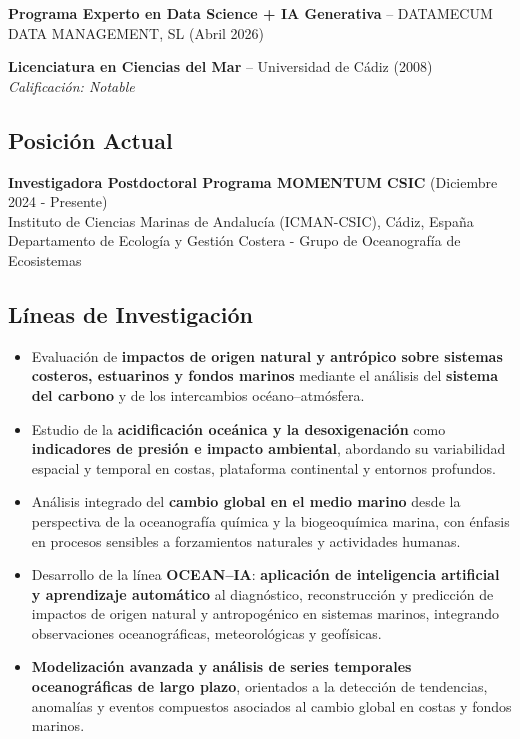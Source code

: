 \documentclass[11pt,a4paper]{article}
\begin{document}
\textbf{Programa Experto en Data Science + IA Generativa} -- DATAMECUM DATA MANAGEMENT, SL (Abril 2026)

\textbf{Licenciatura en Ciencias del Mar} -- Universidad de Cádiz (2008)\\
\textit{Calificación: Notable}

\subsection*{Posición Actual}

\textbf{Investigadora Postdoctoral Programa MOMENTUM CSIC} (Diciembre 2024 - Presente)\\
Instituto de Ciencias Marinas de Andalucía (ICMAN-CSIC), Cádiz, España\\
Departamento de Ecología y Gestión Costera - Grupo de Oceanografía de Ecosistemas

\subsection*{Líneas de Investigación}

\begin{itemize}[leftmargin=*]
    \item Evaluación de \textbf{impactos de origen natural y antrópico sobre sistemas costeros, estuarinos y fondos marinos} mediante el análisis del \textbf{sistema del carbono} y de los intercambios océano–atmósfera.
    \item Estudio de la \textbf{acidificación oceánica y la desoxigenación} como \textbf{indicadores de presión e impacto ambiental}, abordando su variabilidad espacial y temporal en costas, plataforma continental y entornos profundos.
    \item Análisis integrado del \textbf{cambio global en el medio marino} desde la perspectiva de la oceanografía química y la biogeoquímica marina, con énfasis en procesos sensibles a forzamientos naturales y actividades humanas.
    \item Desarrollo de la línea \textbf{OCEAN--IA}: \textbf{aplicación de inteligencia artificial y aprendizaje automático} al diagnóstico, reconstrucción y predicción de impactos de origen natural y antropogénico en sistemas marinos, integrando observaciones oceanográficas, meteorológicas y geofísicas.
    \item \textbf{Modelización avanzada y análisis de series temporales oceanográficas de largo plazo}, orientados a la detección de tendencias, anomalías y eventos compuestos asociados al cambio global en costas y fondos marinos.
\end{itemize}
\end{document}
